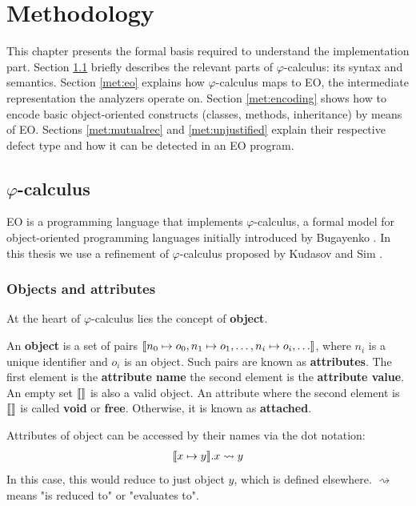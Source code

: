 \chapter{Methodology}
\label{chap:met}
This chapter presents the formal basis required to understand the implementation part. Section \ref{met:phicalc} briefly describes the relevant parts of $\varphi$-calculus: its syntax and semantics. Section \ref{met:eo} explains how $\varphi$-calculus maps to EO, the intermediate representation the analyzers operate on. Section \ref{met:encoding} shows how to encode basic object-oriented constructs (classes, methods, inheritance) by means of EO. Sections \ref{met:mutualrec} and \ref{met:unjustified} explain their respective defect type and how it can be detected in an EO program.

\section{$\varphi$-calculus}
\label{met:phicalc}

EO is a programming language that implements $\varphi$-calculus, a formal model for object-oriented programming languages initially introduced by Bugayenko \cite{eolang}. In this thesis we use a refinement of $\varphi$-calculus proposed by Kudasov and Sim \cite{kudasov}.

\subsection{Objects and attributes}
At the heart of $\varphi$-calculus lies the concept of \textbf{object}.

\begin{definition}
    An \textbf{object} is a set of pairs $\llbracket n_0 \mapsto o_0, n_1 \mapsto o_1, \hdots, n_i \mapsto o_i, \hdots \rrbracket$, where $n_i$ is a unique identifier and $o_i$ is an object. Such pairs are known as \textbf{attributes}. The first element is the \textbf{attribute name} the second element is the \textbf{attribute value}. An empty set $\llbracket  \rrbracket$ is also a valid object. An attribute where the second element is $\llbracket  \rrbracket$ is called \textbf{void} or \textbf{free}. Otherwise, it is known as \textbf{attached}.
\end{definition}

Attributes of object can be accessed by their names via the dot notation:
\begin{align*}
    \llbracket x \mapsto y \rrbracket.x \rightsquigarrow y
\end{align*}
In this case, this would reduce to just object $y$, which is defined elsewhere. $\rightsquigarrow$ means "is reduced to" or "evaluates to".

